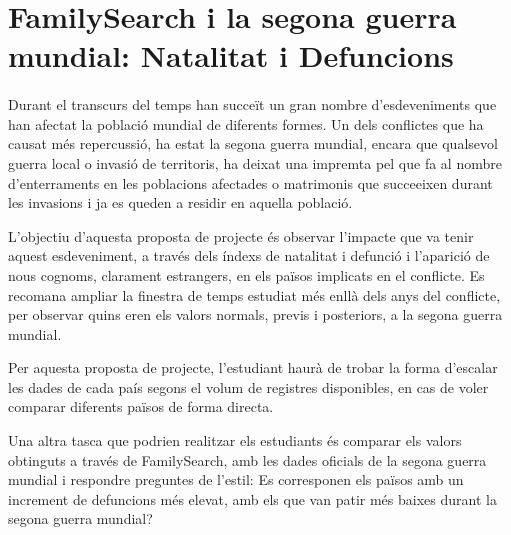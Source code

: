 \section{FamilySearch i la segona guerra mundial: Natalitat i Defuncions}

    \paragraph{}
    Durant el transcurs del temps han succeït un gran nombre d'esdeveniments que han afectat la població mundial de diferents formes. Un dels conflictes que ha causat més repercussió, ha estat la segona guerra mundial, encara que qualsevol guerra local o invasió de territoris, ha deixat una impremta pel que fa al nombre d'enterraments en les poblacions afectades o matrimonis que succeeixen durant les invasions i ja es queden a residir en aquella població.

    L'objectiu d'aquesta proposta de projecte és observar l'impacte que va tenir aquest esdeveniment, a través dels índexs de natalitat i defunció i l'aparició de nous cognoms, clarament estrangers, en els països implicats en el conflicte. Es recomana ampliar la finestra de temps estudiat més enllà dels anys del conflicte, per observar quins eren els valors normals, previs i posteriors, a la segona guerra mundial.

    Per aquesta proposta de projecte, l'estudiant haurà de trobar la forma d'escalar les dades de cada país segons el volum de registres disponibles, en cas de voler comparar diferents països de forma directa.

    Una altra tasca que podrien realitzar els estudiants és comparar els valors obtinguts a través de FamilySearch, amb les dades oficials de la segona guerra mundial i respondre preguntes de l'estil: Es corresponen els països amb un increment de defuncions més elevat, amb els que van patir més baixes durant la segona guerra mundial?
